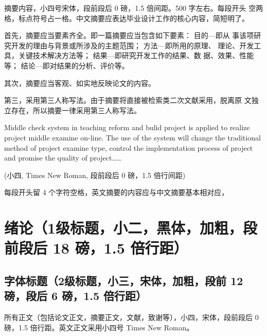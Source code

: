 \documentclass[12pt]{zjutbook}
\begin{document}
\zjutpreface

\begin{abstractcn}
  摘要内容，小四号宋体，段前段后 0 磅，1.5 倍间距。500 字左右。每段开头
  空两格，标点符号占一格。中文摘要应表达毕业设计工作的核心内容，简短明了。

  首先，摘要应当要素齐全。即一篇摘要应当包含如下要素： 目的—即从
  事该项研究开发的理由与背景或所涉及的主题范围； 方法—即所用的原理、
  理论、开发工具，关键技术解决方法等； 结果—即研究开发工作的结果、数
  据、效果、性能等； 结论—即对结果的分析、评价等。

  其次，摘要应当客观、如实地反映论文的内容。

  第三，采用第三人称写法。由于摘要将直接被检索类二次文献采用，脱离原
  文独立存在，所以摘要一律采用第三人称写法。

\end{abstractcn}


\begin{abstracten}
  Middle check system in teaching reform and bulid project is applied to realize
  project middle examine on-line. The use of the system will change the traditional
  method of project examine type, control the implementation process of project and
  promise the quality of project……

  (小四, Times New Roman, 段前段后 0 磅，1.5 倍行间距)

  每段开头留 4 个字符空格，英文摘要的内容应与中文摘要基本相对应，

\end{abstracten}


\frontmatter
\onehalfspacing
\tableofcontents
\clearpage
\listoffigures
\clearpage
\listoftables


\mainmatter
\doublespacing
\chapter{绪论（1级标题，小二，黑体，加粗，段前段后 18 磅，1.5 倍行距）}

\section{字体标题（2级标题，小三，宋体，加粗，段前 12 磅，段后 6 磅，1.5 倍行距）}
所有正文（包括论文正文，摘要正文，文献，致谢等），小四，宋体，段前段后 0 磅，1.5 倍行距。英文正文采用小四号 Times New Roman。
\end{document}
